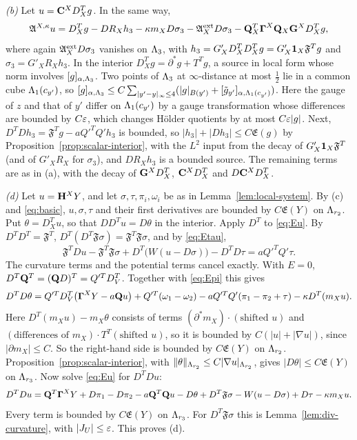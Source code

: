 \emph{(b)} Let $u=\mathbf C^XD^T_Xg$. In the same way,
\[
\mathfrak A^{X,\kappa}u=D^T_Xg-DR_Xh_3-\kappa m_XD\sigma_3-\mathfrak A^{\rm ext}_XD\sigma_3-\mathbf Q_X^T\boldsymbol\Gamma^X\mathbf Q_X\mathbf G^XD^T_Xg,
\]
where again $\mathfrak A^{\rm ext}_XD\sigma_3$ vanishes on $\Lambda_3$,
with $h_3=G'_XD^T_XD^T_Xg=G'_X\mathbf 1_X\mathfrak F^Tg$ and $\sigma_3=G'_XR_Xh_3$. In the interior $D^T_Xg=\partial^*g+T^Tg$, a source in local form whose norm involves $[g]_{\alpha,\Lambda_3}$. Two points of $\Lambda_3$ at $\infty$-distance at most $\frac12$ lie in a common cube $\Lambda_1(c_{y'})$, so $[g]_{\alpha,\Lambda_3}\le C\sum_{|y'-y|_\infty\le4}(|g|_{B(y')}+[\tilde g_{y'}]_{\alpha,\Lambda_1(c_{y'})})$. Here the gauge of $z$ and that of $y'$ differ on $\Lambda_1(c_{y'})$ by a gauge transformation whose differences are bounded by $C\varepsilon$, which changes H\"older quotients by at most $C\varepsilon|g|$. Next, $D^TDh_3=\mathfrak F^Tg-aQ'^TQ'h_3$ is bounded, so $|h_3|+|Dh_3|\le C\mathfrak E(g)$ by Proposition~\ref{prop:scalar-interior}, with the $L^2$ input from the decay of $G'_X\mathbf 1_X\mathfrak F^T$ (and of $G'_XR_X$ for $\sigma_3$), and $DR_Xh_3$ is a bounded source. The remaining terms are as in (a), with the decay of $\mathbf G^XD^T_X$, $\mathbf C^XD^T_X$ and $D\mathbf C^XD^T_X$.

\emph{(d)} Let $u=\mathbf H^XY$, and let $\sigma,\tau,\pi_i,\omega_i$ be as in Lemma~\ref{lem:local-system}. By (c) and \eqref{eq:basic}, $u,\sigma,\tau$ and their first derivatives are bounded by $C\mathfrak E(Y)$ on $\Lambda_{r_2}$. Put $\theta=D^T_Xu$, so that $DD^Tu=D\theta$ in the interior. Apply $D^T$ to \eqref{eq:Eu}. By $D^TD^T=\mathfrak F^T$, $D^T(D^T\mathfrak F\sigma)=\mathfrak F^T\mathfrak F\sigma$, and by \eqref{eq:Etau},
\[
\mathfrak F^TDu-\mathfrak F^T\mathfrak F\sigma+D^T\big(W(u-D\sigma)\big)-D^TD\tau=aQ'^TQ'\tau .
\]
The curvature terms and the potential terms cancel exactly. With $E=0$, $D^T\mathbf Q^T=(\mathbf Q D)^T=Q'^TD_V^T$. Together with \eqref{eq:Epi} this gives
\[
D^TD\theta=Q'^TD_V^T\big(\boldsymbol\Gamma^XY-a\mathbf Q u\big)+Q'^T(\omega_1-\omega_2)-aQ'^TQ'(\pi_1-\pi_2+\tau)-\kappa D^T(m_Xu).
\]
Here $D^T(m_Xu)-m_X\theta$ consists of terms $(\partial^*m_X)\cdot(\text{shifted }u)$ and $(\text{differences of }m_X)\cdot T^T(\text{shifted }u)$, so it is bounded by $C(|u|+|\nabla u|)$, since $|\partial m_X|\le C$. So the right-hand side is bounded by $C\mathfrak E(Y)$ on $\Lambda_{r_2}$. Proposition~\ref{prop:scalar-interior}, with $\|\theta\|_{\Lambda_{r_2}}\le C|\nabla u|_{\Lambda_{r_2}}$, gives $|D\theta|\le C\mathfrak E(Y)$ on $\Lambda_{r_3}$. Now solve \eqref{eq:Eu} for $D^TDu$:
\[
D^TDu=\mathbf Q^T\boldsymbol\Gamma^XY+D\pi_1-D\pi_2-a\mathbf Q^T\mathbf Q u-D\theta+D^T\mathfrak F\sigma-W(u-D\sigma)+D\tau-\kappa m_Xu .
\]
Every term is bounded by $C\mathfrak E(Y)$ on $\Lambda_{r_3}$. For $D^T\mathfrak F\sigma$ this is Lemma~\ref{lem:div-curvature}, with $|J_U|\le\varepsilon$. This proves (d).

